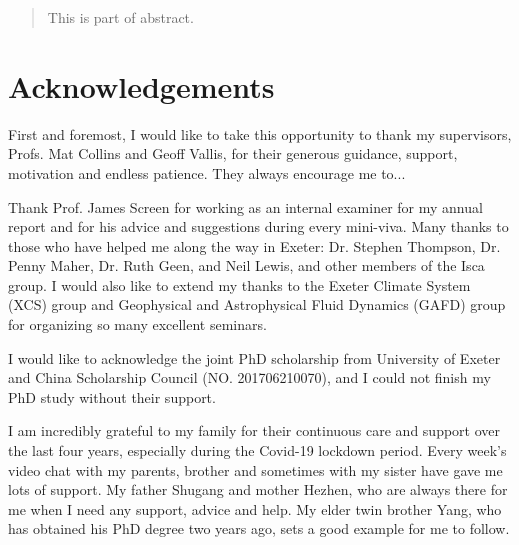 
\maketitle

\begin{abstract}
This is part of abstract.
\end{abstract}

\makedeclaration

\newpage
\chapter*{Acknowledgements}
First and foremost, I would like to take this opportunity to thank my supervisors, Profs. Mat Collins and Geoff Vallis, for their generous guidance, support, motivation and endless patience. They always encourage me to...

Thank Prof. James Screen for working as an internal examiner for my annual report and for his advice and suggestions during every mini-viva. 
Many thanks to those who have helped me along the way in Exeter: Dr. Stephen Thompson, Dr. Penny Maher, Dr. Ruth Geen, and Neil Lewis, and other members of the Isca group. I would also like to extend my thanks to the Exeter Climate System (XCS) group and Geophysical and Astrophysical Fluid Dynamics (GAFD) group for organizing so many excellent seminars.

I would like to acknowledge the joint PhD scholarship from University of Exeter and China Scholarship Council (NO. 201706210070), and I could not finish my PhD study without their support.

I am incredibly grateful to my family for their continuous care and support over the last four years, especially during the Covid-19 lockdown period. Every week's video chat with my parents, brother and sometimes with my sister have gave me lots of support. My father Shugang and mother Hezhen, who are always there for me when I need any support, advice and help. My elder twin brother Yang, who has obtained his PhD degree two years ago, sets a good example for me to follow. %

